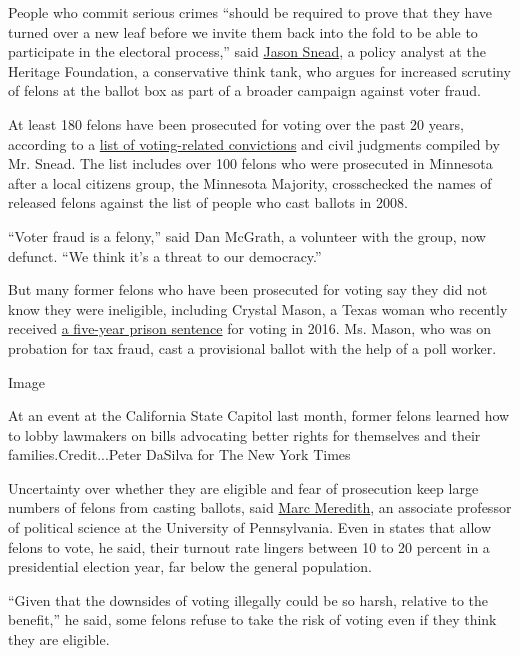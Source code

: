 People who commit serious crimes ``should be required to prove that they
have turned over a new leaf before we invite them back into the fold to
be able to participate in the electoral process,'' said
\href{https://www.heritage.org/staff/jason-snead}{Jason Snead}, a policy
analyst at the Heritage Foundation, a conservative think tank, who
argues for increased scrutiny of felons at the ballot box as part of a
broader campaign against voter fraud.

At least 180 felons have been prosecuted for voting over the past 20
years, according to a \href{https://www.heritage.org/voterfraud}{list of
voting-related convictions} and civil judgments compiled by Mr. Snead.
The list includes over 100 felons who were prosecuted in Minnesota after
a local citizens group, the Minnesota Majority, crosschecked the names
of released felons against the list of people who cast ballots in 2008.

``Voter fraud is a felony,'' said Dan McGrath, a volunteer with the
group, now defunct. ``We think it's a threat to our democracy.''

But many former felons who have been prosecuted for voting say they did
not know they were ineligible, including Crystal Mason, a Texas woman
who recently received
\href{https://www.npr.org/sections/thetwo-way/2018/03/31/598458914/texas-woman-sentenced-to-5-years-for-illegal-voting}{a
five-year prison sentence} for voting in 2016. Ms. Mason, who was on
probation for tax fraud, cast a provisional ballot with the help of a
poll worker.

Image

At an event at the California State Capitol last month, former felons
learned how to lobby lawmakers on bills advocating better rights for
themselves and their families.Credit...Peter DaSilva for The New York
Times

Uncertainty over whether they are eligible and fear of prosecution keep
large numbers of felons from casting ballots, said
\href{https://www.sas.upenn.edu/~marcmere/}{Marc Meredith}, an associate
professor of political science at the University of Pennsylvania. Even
in states that allow felons to vote, he said, their turnout rate lingers
between 10 to 20 percent in a presidential election year, far below the
general population.

``Given that the downsides of voting illegally could be so harsh,
relative to the benefit,'' he said, some felons refuse to take the risk
of voting even if they think they are eligible.

